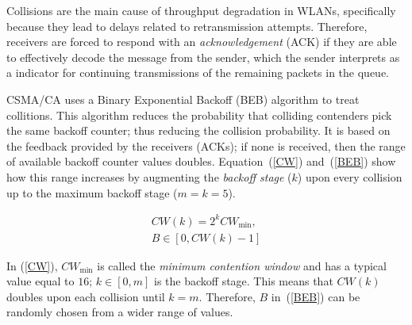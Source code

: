 Collisions are the main cause of throughput degradation in WLANs, specifically because they lead to delays related to retransmission attempts. Therefore, receivers are forced to respond with an \emph{acknowledgement} (ACK) if they are able to effectively decode the message from the sender, which the sender interprets as a indicator for continuing transmissions of the remaining packets in the queue. 


CSMA/CA uses a Binary Exponential Backoff (BEB) algorithm to treat collitions. This algorithm reduces the probability that colliding contenders pick the same backoff counter; thus reducing the collision probability. It is based on the feedback provided by the receivers (ACKs); if none is received, then the range of available backoff counter values doubles. Equation~(\ref{CW}) and~(\ref{BEB}) show how this range increases by augmenting the \emph{backoff stage} ($k$) upon every collision up to the maximum backoff stage ($m=k=5$).


\begin{subequations}
\begin{align}
	CW(k)= 2^{k}CW_{\min},\label{CW}\\
	B\in[0,CW(k)-1]\label{BEB}
\end{align}
\end{subequations}

In (\ref{CW}), $CW_{\min}$ is called the \emph{minimum contention window} and has a typical value equal to $16$; $k\in[0,m]$ is the backoff stage. This means that $CW(k)$ doubles upon each collision until $k=m$. Therefore, $B$ in~(\ref{BEB}) can be randomly chosen from a wider range of values.
